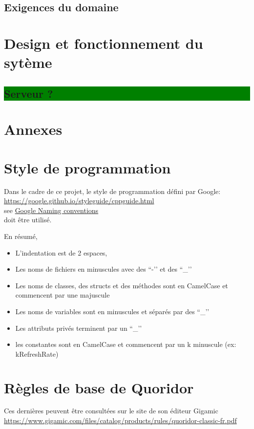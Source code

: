 \documentclass[french, utf8]{article}
\begin{document}
\subsection{Exigences du domaine}


\section{Design et fonctionnement du sytème}
\colorbox{green}{\subsection{Serveur ?}
\label{sec:Server}}


\newpage
\section{Annexes}
\appendix

\label{sec:Annexes}
\section{Style de programmation}

Dans le cadre de ce projet, le style de programmation défini par Google:
\\ \href{https://google.github.io/styleguide/cppguide.html}{https://google.github.io/styleguide/cppguide.html}
\\ see \href{https://google.github.io/styleguide/cppguide.html#Naming}{Google Naming conventions}
\\doit être utilisé.

En résumé,
\begin{itemize}
	\item L'indentation est de 2 espaces,
	\item Les noms de fichiers en minuscules avec des ``-’’ et des ``\_’’
	\item Les noms de classes, des structs et des méthodes sont en CamelCase et commencent par une majuscule
	\item Les noms de variables sont en minuscules et séparés par des ``\_’’
	\item Les attributs privés terminent par un ``\_’’
	\item les constantes sont en CamelCase et commencent par un k minuscule (ex: kRefreshRate)
\end{itemize}

\section{Règles de base de Quoridor}
Ces dernières peuvent être consultées sur le site de son éditeur Gigamic \href{https://www.gigamic.com/files/catalog/products/rules/quoridor-classic-fr.pdf}{https://www.gigamic.com/files/catalog/products/rules/quoridor-classic-fr.pdf}
\end{document}
